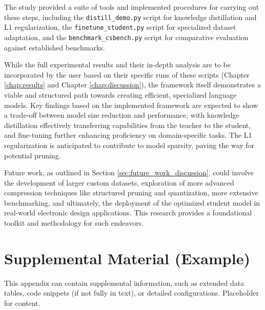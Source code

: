 \documentclass[12pt, a4paper]{report}
\begin{document}
The study provided a suite of tools and implemented procedures for carrying out these steps, including the \texttt{distill\_demo.py} script for knowledge distillation and L1 regularization, the \texttt{finetune\_student.py} script for specialized dataset adaptation, and the \texttt{benchmark\_csbench.py} script for comparative evaluation against established benchmarks.

While the full experimental results and their in-depth analysis are to be incorporated by the user based on their specific runs of these scripts (Chapter \ref{chap:results} and Chapter \ref{chap:discussion}), the framework itself demonstrates a viable and structured path towards creating efficient, specialized language models. Key findings based on the implemented framework are expected to show a trade-off between model size reduction and performance, with knowledge distillation effectively transferring capabilities from the teacher to the student, and fine-tuning further enhancing proficiency on domain-specific tasks. The L1 regularization is anticipated to contribute to model sparsity, paving the way for potential pruning.

Future work, as outlined in Section \ref{sec:future_work_discussion}, could involve the development of larger custom datasets, exploration of more advanced compression techniques like structured pruning and quantization, more extensive benchmarking, and ultimately, the deployment of the optimized student model in real-world electronic design applications. This research provides a foundational toolkit and methodology for such endeavors.

\appendix
\chapter{Supplemental Material (Example)}
\label{app:supplemental}
This appendix can contain supplemental information, such as extended data tables, code snippets (if not fully in text), or detailed configurations. Placeholder for content.
\end{document}
